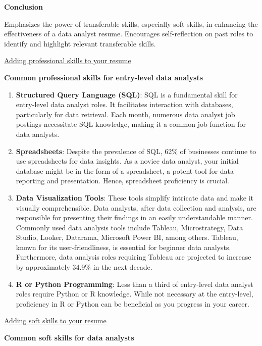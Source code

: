 \documentclass[]{article}
\begin{document}
\textbf{Conclusion}

Emphasizes the power of transferable skills, especially soft skills, in enhancing the effectiveness of a data analyst resume. Encourages self-reflection on past roles to identify and highlight relevant transferable skills.

\uline{Adding professional skills to your resume}

\textbf{Common professional skills for entry-level data analysts}

\begin{enumerate}
  \item \textbf{Structured Query Language (SQL)}: SQL is a fundamental skill for entry-level data analyst roles. It facilitates interaction with databases, particularly for data retrieval. Each month, numerous data analyst job postings necessitate SQL knowledge, making it a common job function for data analysts.

  \item \textbf{Spreadsheets}: Despite the prevalence of SQL, 62\% of businesses continue to use spreadsheets for data insights. As a novice data analyst, your initial database might be in the form of a spreadsheet, a potent tool for data reporting and presentation. Hence, spreadsheet proficiency is crucial.

  \item \textbf{Data Visualization Tools}: These tools simplify intricate data and make it visually comprehensible. Data analysts, after data collection and analysis, are responsible for presenting their findings in an easily understandable manner. Commonly used data analysis tools include Tableau, Microstrategy, Data Studio, Looker, Datarama, Microsoft Power BI, among others. Tableau, known for its user-friendliness, is essential for beginner data analysts. Furthermore, data analysis roles requiring Tableau are projected to increase by approximately 34.9\% in the next decade.

  \item \textbf{R or Python Programming}: Less than a third of entry-level data analyst roles require Python or R knowledge. While not necessary at the entry-level, proficiency in R or Python can be beneficial as you progress in your career.
\end{enumerate}

\uline{Adding soft skills to your resume}

\textbf{Common soft skills for data analysts}
\end{document}
